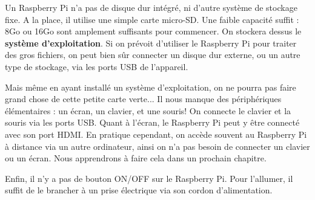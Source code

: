 Un Raspberry Pi n'a pas de disque dur intégré, ni d'autre système de stockage fixe. A la place, il utilise une simple carte micro-SD. Une faible capacité suffit : 8Go ou 16Go sont amplement suffisants pour commencer. On stockera dessus le \textbf{système d'exploitation}. Si on prévoit d'utiliser le Raspberry Pi pour traiter des gros fichiers, on peut bien sûr connecter un disque dur externe, ou un autre type de stockage, via les ports USB de l'appareil.

Mais même en ayant installé un système d'exploitation, on ne pourra pas faire grand chose de cette petite carte verte... Il nous manque des périphériques élémentaires : un écran, un clavier, et une souris!
On connecte le clavier et la souris via les ports USB. Quant à l'écran, le Raspberry Pi peut y être connecté avec son port HDMI.
En pratique cependant, on accède souvent au Raspberry Pi à distance via un autre ordinateur, ainsi on n'a pas besoin de connecter un clavier ou un écran. Nous apprendrons à faire cela dans un prochain chapitre.

Enfin, il n'y a pas de bouton ON/OFF sur le Raspberry Pi. Pour l'allumer, il suffit de le brancher à un prise électrique via son cordon d'alimentation.
